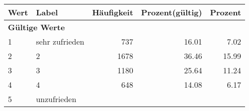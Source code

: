      \begin{longtable}{lXrrr}
     \toprule
     \textbf{Wert} & \textbf{Label} & \textbf{Häufigkeit} & \textbf{Prozent(gültig)} & \textbf{Prozent} \\
     \endhead
     \midrule
     \multicolumn{5}{l}{\textbf{Gültige Werte}}\\

     1 &
     \multicolumn{1}{X}{ sehr zufrieden   } &


       \num{737} &
       \num[round-mode=places,round-precision=2]{16.01} &
         \num[round-mode=places,round-precision=2]{7.02} \\

     2 &
     \multicolumn{1}{X}{ 2   } &


       \num{1678} &
       \num[round-mode=places,round-precision=2]{36.46} &
         \num[round-mode=places,round-precision=2]{15.99} \\

     3 &
     \multicolumn{1}{X}{ 3   } &


       \num{1180} &
       \num[round-mode=places,round-precision=2]{25.64} &
         \num[round-mode=places,round-precision=2]{11.24} \\

     4 &
     \multicolumn{1}{X}{ 4   } &


       \num{648} &
       \num[round-mode=places,round-precision=2]{14.08} &
         \num[round-mode=places,round-precision=2]{6.17} \\

     5 &
     \multicolumn{1}{X}{ unzufrieden   } &



\end{longtable}
